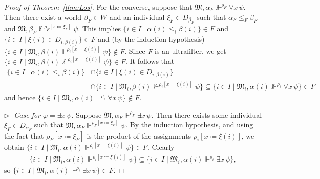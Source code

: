 \documentclass[submission,copyright,creativecommons]{eptcs}
\newcommand{\mo}{\mathfrak}
\renewcommand{\phi}{\varphi}
\newcommand{\satisfySym}{\Vdash}
\newcommand{\satisfy}[4]{#1, #2 \satisfySym^{#4} #3}
\newcommand{\notsatisfy}[4]{#1, #2 \not\Vdash^{#4} #3}
\begin{document}
\begin{proof}[Proof of Theorem~\ref{thm:Los}]
    For the converse, suppose that $\notsatisfy{\mo{M}}{\alpha_F}{\forall x\, \psi}{\rho_F}$. 
    Then there exist a world $\beta_F \in W$ and an individual $\xi_F \in D_{\beta_F}$
    such that $\alpha_F \leq_F \beta_F$
    and $\notsatisfy{\mo{M}}{\beta_F}{\psi}{\rho_F[x \coloneq \xi_F]}$. 
    This implies $\{ i \in I \mid \alpha(i) \leq_i \beta(i) \} \in F$
    and $\{ i \in I \mid \xi(i) \in D_{i,\beta(i)}\} \in F$
    and (by the induction hypothesis)
    $\{ i \in I \mid \satisfy{\mo{M}_i}{\beta(i)}{\psi}{\rho_i[x \coloneq \xi(i)]} \} \notin F$.
    Since $F$ is an ultrafilter, we get
    $\{ i \in I \mid \notsatisfy{\mo{M}_i}{\beta(i)}{\psi}{\rho_i[x \coloneq \xi(i)]} \} \in F$.
    It follows that
    \begin{align*}
      \{ i \in I \mid \alpha(i) \leq_i \beta(i) \}
        &\cap \{ i \in I \mid \xi(i) \in D_{i,\beta(i)} \} \\
        &\cap \{ i \in I \mid \notsatisfy{\mo{M}_i}{\beta(i)}{\psi}{\rho_i[x \coloneq \xi(i)]} \} 
         \subseteq \{ i \in I \mid \notsatisfy{\mo{M}_i}{\alpha(i)}{\forall x\,\psi}{\rho_i}\} \in F
    \end{align*}
    and hence $\{ i \in I \mid \satisfy{\mo{M}_i}{\alpha(i)}{\forall x\,\psi}{\rho_i} \} \notin F$.
    
  \medskip\noindent
  \textit{$\triangleright\;$ Case for $\phi = \exists x\,\psi$.}
    Suppose $\satisfy{\mo{M}}{\alpha_F}{\exists x\,\psi}{\rho_F}$.
    Then there exists some individual $\xi_F \in D_{\alpha_F}$ such that
    $\satisfy{\mo{M}}{\alpha_F}{\psi}{\rho_F[x \coloneq \xi_F]}$.
    By the induction hypothesis, and using the fact that
    $\rho_F[x \coloneq \xi_F]$ is the product of the assignments $\rho_i[x \coloneq \xi(i)]$,
    we obtain
    $\{ i \in I \mid \satisfy{\mo{M}_i}{\alpha(i)}{\psi}{\rho_i[x \coloneq \xi(i)]} \} \in F$.
    Clearly
    \begin{align*}
      \{ i \in I \mid \satisfy{\mo{M}_i}{\alpha(i)}{\psi}{\rho_i[x \coloneq \xi(i)]}\}
        \subseteq \{ i \in I \mid \satisfy{\mo{M}_i}{\alpha(i)}{\exists x\,\psi}{\rho_i} \},
    \end{align*}
    so $\{ i \in I \mid \satisfy{\mo{M}_i}{\alpha(i)}{\exists x\, \psi}{\rho_i} \} \in F$.
  

\end{proof}
\end{document}
